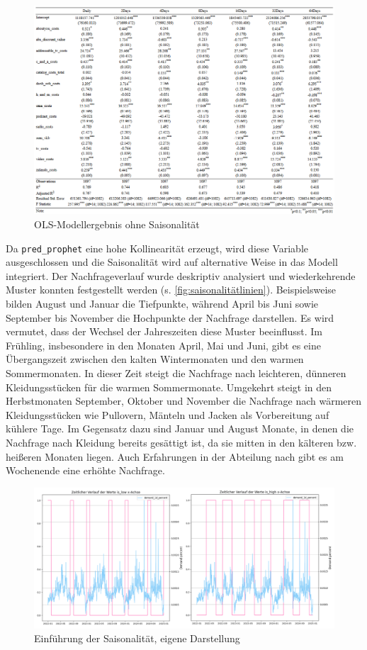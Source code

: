 \begin{figure}[H]
    \centering
    \includegraphics[width=1\linewidth]{images/ols2.png}
    \caption{\ac{OLS}-Modellergebnis ohne Saisonalität}
    \label{fig:OLSohneSaison}
\end{figure}
\noindent
Da \verb|pred_prophet| eine hohe Kollinearität erzeugt, wird diese Variable ausgeschlossen und die Saisonalität wird auf alternative Weise in das Modell integriert. Der Nachfrageverlauf wurde deskriptiv analysiert und wiederkehrende Muster konnten festgestellt werden (s. \autoref{fig:saisonalitätlinien}). Beispielsweise bilden August und Januar die Tiefpunkte, während April bis Juni sowie September bis November die Hochpunkte der Nachfrage darstellen. Es wird vermutet, dass der Wechsel der Jahreszeiten diese Muster beeinflusst. Im Frühling, insbesondere in den Monaten April, Mai und Juni, gibt es eine Übergangszeit zwischen den kalten Wintermonaten und den warmen Sommermonaten. In dieser Zeit steigt die Nachfrage nach leichteren, dünneren Kleidungsstücken für die warmen Sommermonate. Umgekehrt steigt in den Herbstmonaten September, Oktober und November die Nachfrage nach wärmeren Kleidungsstücken wie Pullovern, Mänteln und Jacken als Vorbereitung auf kühlere Tage. Im Gegensatz dazu sind Januar und August Monate, in denen die Nachfrage nach Kleidung bereits gesättigt ist, da sie mitten in den kälteren bzw. heißeren Monaten liegen. Auch Erfahrungen in der Abteilung nach gibt es am Wochenende eine erhöhte Nachfrage. \par
\begin{figure}[H]
    \centering
    \includegraphics[width=1\linewidth]{images/nachfrageverlauf.png}
    \caption{Einführung der Saisonalität, eigene Darstellung}
    \label{fig:saisonalitätlinien}
\end{figure}
